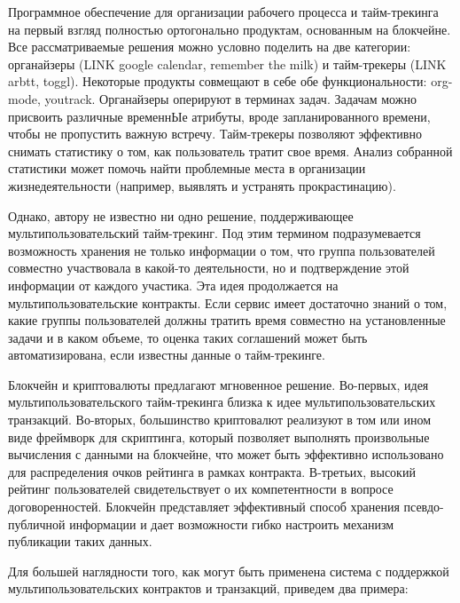 \documentclass[]{itmo-student-thesis}
\begin{document}
Программное обеспечение для организации рабочего процесса и
тайм-трекинга на первый взгляд полностью ортогонально продуктам,
основанным на блокчейне. Все рассматриваемые решения можно условно
поделить на две категории: органайзеры (LINK google calendar, remember
the milk) и тайм-трекеры (LINK arbtt, toggl). Некоторые продукты
совмещают в себе обе функциональности: org-mode, youtrack. Органайзеры
оперируют в терминах задач. Задачам можно присвоить различные
временнЫе атрибуты, вроде запланированного времени, чтобы не
пропустить важную встречу. Тайм-трекеры позволяют эффективно снимать
статистику о том, как пользователь тратит свое время. Анализ собранной
статистики может помочь найти проблемные места в организации
жизнедеятельности (например, выявлять и устранять прокрастинацию).

Однако, автору не известно ни одно решение, поддерживающее
мультипользовательский тайм-трекинг. Под этим термином подразумевается
возможность хранения не только информации о том, что группа
пользователей совместно участвовала в какой-то деятельности, но и
подтверждение этой информации от каждого участика. Эта идея
продолжается на мультипользовательские контракты. Если сервис имеет
достаточно знаний о том, какие группы пользователей должны тратить
время совместно на установленные задачи и в каком объеме, то оценка
таких соглашений может быть автоматизирована, если известны данные о
тайм-трекинге.

Блокчейн и криптовалюты предлагают мгновенное решение. Во-первых, идея
мультипользовательского тайм-трекинга близка к идее
мультипользовательских транзакций. Во-вторых, большинство криптовалют
реализуют в том или ином виде фреймворк для скриптинга, который
позволяет выполнять произвольные вычисления с данными на блокчейне,
что может быть эффективно использовано для распределения очков
рейтинга в рамках контракта. В-третьих, высокий рейтинг пользователей
свидетельствует о их компетентности в вопросе
договоренностей. Блокчейн представляет эффективный способ хранения
псевдо-публичной информации и дает возможности гибко настроить
механизм публикации таких данных.

Для большей наглядности того, как могут быть применена система с
поддержкой мультипользовательских контрактов и транзакций, приведем
два примера:
\end{document}
